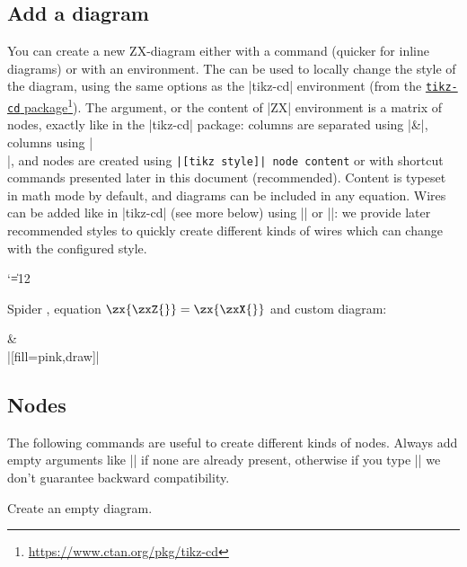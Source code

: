 \documentclass[a4paper]{ltxdoc}
\newcommand{\mylink}[2]{\href{#1}{#2}\footnote{\url{#1}}}
\begin{document}
\subsection{Add a diagram}
\begin{pgfmanualentry}
  \extractcommand\zx{}\@@
  \@@
  \pgfmanualbody
  You can create a new ZX-diagram either with a command (quicker for inline diagrams) or with an environment. The  can be used to locally change the style of the diagram, using the same options as the |{tikz-cd}| environment (from the \mylink{https://www.ctan.org/pkg/tikz-cd}{\texttt{tikz-cd} package}). The  argument, or the content of |{ZX}| environment is a \tikzname{} matrix of nodes, exactly like in the |tikz-cd| package: columns are separated using |&|, columns using |\\|, and nodes are created using \verb#|[tikz style]| node content# or with shortcut commands presented later in this document (recommended). Content is typeset in math mode by default, and diagrams can be included in any equation. Wires can be added like in |tikz-cd| (see more below) using |\arrow| or |\ar|: we provide later recommended styles to quickly create different kinds of wires which can change with the configured style.
{\catcode`\|=12 %
\begin{codeexample}[]
Spider \zx{\zxZ{\alpha}}, equation $\zx{\zxZ{}} = \zx{\zxX{}}$ %
and custom diagram: %
\begin{ZX}[red]
  \zxZ{\beta} \arrow[r]                           & \zxZ{\alpha} \\
  |[fill=pink,draw]| \gamma {}
\end{ZX}
\end{codeexample}
}
\end{pgfmanualentry}

\subsection{Nodes}

The following commands are useful to create different kinds of nodes. Always add empty arguments like |\example{}| if none are already present, otherwise if you type |\example| we don't guarantee backward compatibility.

\begin{command}{\zxEmptyDiagram{}}
  Create an empty diagram.
\begin{codeexample}[width=3cm]
\begin{ZX}
  \zxEmptyDiagram{}
\end{ZX}
\end{codeexample}
\end{command}
\end{document}
